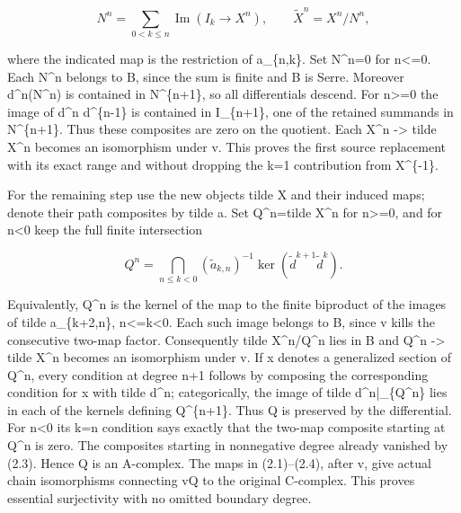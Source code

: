 \documentclass[11pt]{article}
\begin{document}
\[
 N^n=\sum_{0<k\le n}\operatorname{Im}
                  (I_k\longrightarrow X^n),\qquad
 \widetilde X^n=X^n/N^n,                                \tag{2.3}
\]

where the indicated map is the restriction of a\_\allowbreak{}\{n,\allowbreak{}k\}. Set N\textasciicircum{}n\allowbreak{}=0 for n<\allowbreak{}=0. Each N\^{}n belongs to B,\allowbreak{} since the sum is finite and B is Serre. Moreover d\textasciicircum{}n(N\textasciicircum{}n)\allowbreak{} is contained in N\textasciicircum{}\{n\allowbreak{}+1\},\allowbreak{} so all differentials descend. For n>\allowbreak{}=0 the image of d\^{}n d\^{}\{n-1\} is contained in I\_\allowbreak{}\{n\allowbreak{}+1\},\allowbreak{} one of the retained summands in N\textasciicircum{}\{n\allowbreak{}+1\}. Thus these composites are zero on the quotient. Each X\^{}n \allowbreak{}-> tilde X\^{}n becomes an isomorphism under v. This proves the first source replacement with its exact range and without dropping the k\allowbreak{}=1 contribution from X\^{}\{-1\}.

For the remaining step use the new objects tilde X and their induced maps; denote their path composites by tilde a. Set Q\textasciicircum{}n\allowbreak{}=tilde X\^{}n for n>\allowbreak{}=0,\allowbreak{} and for n\textless0 keep the full finite intersection

\[
 Q^n=\bigcap_{n\le k<0}
       (\widetilde a_{k,n})^{-1}
       \ker(\widetilde d^{k+1}\widetilde d^k).             \tag{2.4}
\]

Equivalently,\allowbreak{} Q\^{}n is the kernel of the map to the finite biproduct of the images of tilde a\_\allowbreak{}\{k\allowbreak{}+2,\allowbreak{}n\},\allowbreak{} n<\allowbreak{}=k<0. Each such image belongs to B,\allowbreak{} since v kills the consecutive two-map factor. Consequently tilde X\textasciicircum{}n/\allowbreak{}Q\textasciicircum{}n lies in B and Q\^{}n \allowbreak{}-> tilde X\^{}n becomes an isomorphism under v. If x denotes a generalized section of Q\textasciicircum{}n,\allowbreak{} every condition at degree n\allowbreak{}+1 follows by composing the corresponding condition for x with tilde d\^{}n; categorically,\allowbreak{} the image of tilde d\textasciicircum{}n|\_\allowbreak{}\{Q\textasciicircum{}n\} lies in each of the kernels defining Q\textasciicircum{}\{n\allowbreak{}+1\}. Thus Q is preserved by the differential. For n\textless0 its k\allowbreak{}=n condition says exactly that the two-map composite starting at Q\^{}n is zero. The composites starting in nonnegative degree already vanished by (2.3)\allowbreak{}. Hence Q is an A-complex. The maps in (2.1)\allowbreak{}–\allowbreak{}(2.4)\allowbreak{},\allowbreak{} after v,\allowbreak{} give actual chain isomorphisms connecting vQ to the original C-complex. This proves essential surjectivity with no omitted boundary degree.
\end{document}
